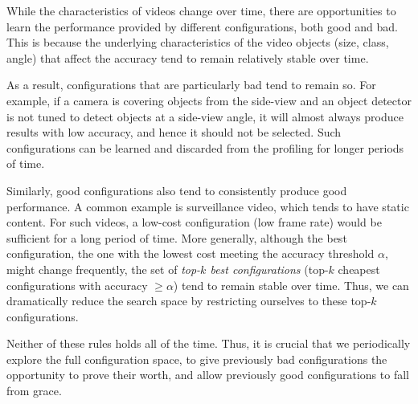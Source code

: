 While the characteristics of videos change over time, there are opportunities to learn the performance provided by different configurations, both good and bad. This is because the underlying characteristics of the video objects (\eg size, class, angle) that affect the accuracy tend to remain relatively stable over time. 

As a result, configurations that are particularly bad tend to remain so. For example, if a camera is covering objects from the side-view and an object detector is not tuned to detect objects at a side-view angle, it will almost always produce results with low accuracy, and hence it should not be selected. Such configurations can be learned and discarded from the profiling for longer periods of time. 

Similarly, good configurations also tend to consistently produce good performance. A common example is surveillance video, which tends to have  static content. For such videos, a low-cost configuration (\eg low frame rate) would be sufficient for a long period of time. More generally, although the best configuration, \ie the one with the lowest  cost meeting the accuracy threshold $\alpha$, might change frequently, the set of {\em top-$k$ best configurations} (top-$k$ cheapest configurations with accuracy $\geq \alpha$) tend to remain stable over time. Thus, we can dramatically reduce the search space by restricting ourselves to these top-$k$ configurations.

Neither of these rules holds all of the time. Thus, it is crucial that we periodically explore the full configuration space, to give previously bad configurations the opportunity to prove their worth, and allow previously good configurations to fall from grace. 



